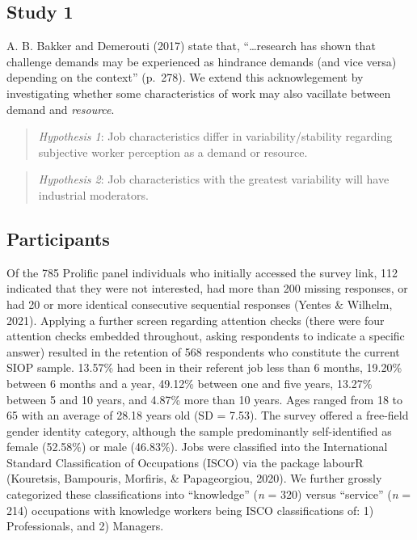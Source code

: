 \documentclass[
  english,
  man]{apa6}
\begin{document}
\hypertarget{study-1}{%
\subsection{Study 1}\label{study-1}}

A. B. Bakker and Demerouti (2017) state that, ``\ldots research has shown that challenge demands may be experienced as hindrance demands (and vice versa) depending on the context'' (p.~278). We extend this acknowlegement by investigating whether some characteristics of work may also vacillate between demand and \emph{resource}.

\begin{quote}
\emph{Hypothesis 1}: Job characteristics differ in variability/stability regarding subjective worker perception as a demand or resource.
\end{quote}

\begin{quote}
\emph{Hypothesis 2}: Job characteristics with the greatest variability will have industrial moderators.
\end{quote}

\hypertarget{participants}{%
\subsection{Participants}\label{participants}}

Of the 785 Prolific panel individuals who initially accessed the survey link, 112 indicated that they were not interested, had more than 200 missing responses, or had 20 or more identical consecutive sequential responses (Yentes \& Wilhelm, 2021). Applying a further screen regarding attention checks (there were four attention checks embedded throughout, asking respondents to indicate a specific answer) resulted in the retention of 568 respondents who constitute the current SIOP sample. 13.57\% had been in their referent job less than 6 months, 19.20\% between 6 months and a year, 49.12\% between one and five years, 13.27\% between 5 and 10 years, and 4.87\% more than 10 years. Ages ranged from 18 to 65 with an average of 28.18 years old (SD = 7.53). The survey offered a free-field gender identity category, although the sample predominantly self-identified as female (52.58\%) or male (46.83\%). Jobs were classified into the International Standard Classification of Occupations (ISCO) via the package labourR (Kouretsis, Bampouris, Morfiris, \& Papageorgiou, 2020). We further grossly categorized these classifications into ``knowledge'' (\emph{n} = 320) versus ``service'' (\emph{n} = 214) occupations with knowledge workers being ISCO classifications of: 1) Professionals, and 2) Managers.
\end{document}
